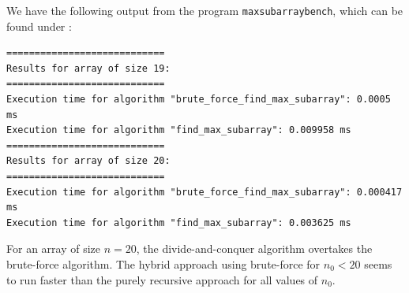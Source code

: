 We have the following output from the program \verb|maxsubarraybench|,
which can be found under :
\small\begin{verbatim}
============================
Results for array of size 19:
============================
Execution time for algorithm "brute_force_find_max_subarray": 0.0005 ms
Execution time for algorithm "find_max_subarray": 0.009958 ms
============================
Results for array of size 20:
============================
Execution time for algorithm "brute_force_find_max_subarray": 0.000417 ms
Execution time for algorithm "find_max_subarray": 0.003625 ms
\end{verbatim}\normalsize
For an array of size $n = 20$, the divide-and-conquer algorithm overtakes the 
brute-force algorithm. The hybrid approach using brute-force for $n_0 < 20$ 
seems to run faster than the purely recursive approach for all values of $n_0$.
